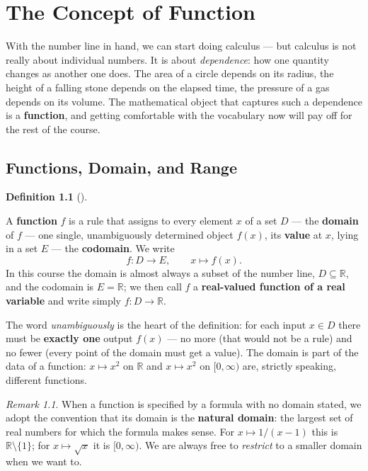 \documentclass[
  letterpaper,
  DIV=11,
  numbers=noendperiod]{scrreprt}
\theoremstyle{plain}
\theoremstyle{plain}
\theoremstyle{definition}
\newtheorem{definition}{Definition}[chapter]
\theoremstyle{definition}
\theoremstyle{definition}
\theoremstyle{plain}
\theoremstyle{plain}
\theoremstyle{remark}
\newtheorem{refremark}{Remark}[chapter]
\begin{document}
\chapter{The Concept of Function}\label{the-concept-of-function}

With the number line in hand, we can start doing calculus --- but
calculus is not really about individual numbers. It is about
\emph{dependence}: how one quantity changes as another one does. The
area of a circle depends on its radius, the height of a falling stone
depends on the elapsed time, the pressure of a gas depends on its
volume. The mathematical object that captures such a dependence is a
\textbf{function}, and getting comfortable with the vocabulary now will
pay off for the rest of the course.

\section{Functions, Domain, and Range}\label{functions-domain-and-range}

\begin{definition}[]\protect\hypertarget{def-function}{}\label{def-function}

\hfill\break
A \textbf{function} \(f\) is a rule that assigns to every element \(x\)
of a set \(D\) --- the \textbf{domain} of \(f\) --- one single,
unambiguously determined object \(f(x)\), its \textbf{value} at \(x\),
lying in a set \(E\) --- the \textbf{codomain}. We write \[
f\colon D \to E, \qquad x \mapsto f(x).
\] In this course the domain is almost always a subset of the number
line, \(D\subseteq\mathbb{R}\), and the codomain is \(E=\mathbb{R}\); we
then call \(f\) a \textbf{real-valued function of a real variable} and
write simply \(f\colon D\to\mathbb{R}\).

\end{definition}

The word \emph{unambiguously} is the heart of the definition: for each
input \(x\in D\) there must be \textbf{exactly one} output \(f(x)\) ---
no more (that would not be a rule) and no fewer (every point of the
domain must get a value). The domain is part of the data of a function:
\(x\mapsto x^2\) on \(\mathbb{R}\) and \(x\mapsto x^2\) on
\([0,\infty)\) are, strictly speaking, different functions.

\begin{refremark}
When a function is specified by a formula with no domain stated, we
adopt the convention that its domain is the \textbf{natural domain}: the
largest set of real numbers for which the formula makes sense. For
\(x\mapsto 1/(x-1)\) this is \(\mathbb{R}\setminus\{1\}\); for
\(x\mapsto\sqrt{x}\) it is \([0,\infty)\). We are always free to
\emph{restrict} to a smaller domain when we want to.

\label{rem-natural-domain}

\end{refremark}
\end{document}
